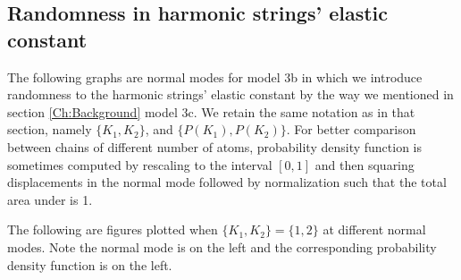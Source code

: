 \newpage
\subsection{Randomness in harmonic strings' elastic constant}
The following graphs are normal modes for model 3b in which we introduce randomness to the harmonic strings' elastic constant by the way we mentioned in section \ref{Ch:Background} model 3c. We retain the same notation as in that section, namely $\{K_1,K_2\}$, and $\{P(K_1),P(K_2)\}$. 
For better comparison between chains of different number of atoms, probability density function is sometimes computed by rescaling to the interval $[0,1]$ and then squaring displacements in the normal mode followed by normalization such that the total area under is 1.


The following are figures plotted when $\{K_1,K_2\} = \{1,2\}$ at different normal modes. Note the normal mode is on the left and the corresponding probability density function is on the left.

